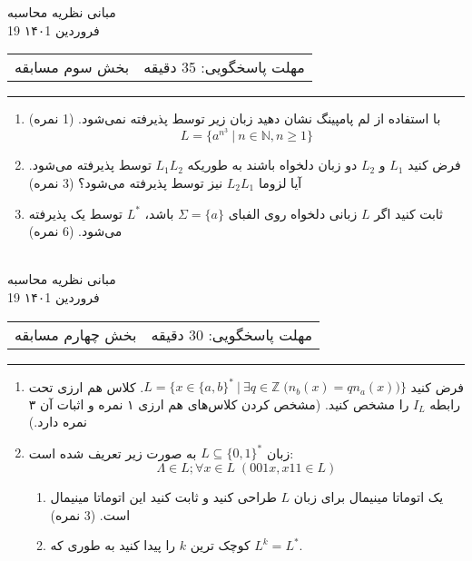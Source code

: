 \documentclass{article}
\begin{document}
   	\newpage
   	\begin{center}
   		\Huge
   		مبانی نظریه محاسبه
   		\\
   		\vspace{0.2in}
   		\Large
   		19 فروردین ۱۴۰1
   	\end{center}
   	\Large
   	\begin{tabularx}{\linewidth}{>{\raggedleft\arraybackslash}X>{\raggedright\arraybackslash}X}
   		بخش سوم مسابقه
   		&
   		مهلت پاسخگویی: 35 دقیقه
   	\end{tabularx}
   	\rule{\textwidth}{1pt}
   	\begin{enumerate}
   		
   	
  
   	\item
   با استفاده از لم پامپینگ نشان دهید زبان زیر توسط  پذیرفته نمی‌شود. (1 نمره)
   $$L = \{a^{n^3} \:|\: n \in \mathbb{N}, n \geq 1\}$$
   	 
	 \item
    فرض کنید $L_1$ و $L_2$ دو زبان دلخواه باشند به طوریکه $L_1L_2$ توسط  پذیرفته می‌شود. آیا لزوما  $L_2L_1$ نیز توسط  پذیرفته می‌شود؟ (3 نمره)
   	\item
    ثابت کنید اگر $L$ زبانی دلخواه روی الفبای $\Sigma = \{a\}$ باشد، $L^*$ توسط یک  پذیرفته می‌شود. (6 نمره)
    	 \\
    	 \\
    	\end{enumerate}
    	    	\newpage
    	 \begin{center}
    	 	\Huge
    	 	مبانی نظریه محاسبه
    	 	\\
    	 	\vspace{0.2in}
    	 	\Large
    	 	19 فروردین ۱۴۰1
    	 \end{center}
    	 \Large
    	 \begin{tabularx}{\linewidth}{>{\raggedleft\arraybackslash}X>{\raggedright\arraybackslash}X}
    	 	بخش چهارم مسابقه
    	 	&
    	 	مهلت پاسخگویی: 30 دقیقه
    	 \end{tabularx}
    	 \rule{\textwidth}{1pt}
    		\begin{enumerate}
    			\item 
    			فرض کنید 
    		$L = \{x \in \{a,b\}^* \:|\: \exists q \in \mathbb{Z} \; \big(n_b(x) = qn_a(x)\big)\}$.
    			کلاس هم ارزی تحت رابطه $I_L$ را مشخص کنید. (مشخص کردن کلاس‌های هم ارزی ۱ نمره و اثبات آن ۳ نمره دارد.)
\item 
    	 زبان $L \subseteq \{0,1\}^*$ به صورت زیر تعریف شده است:
    	 $$\Lambda \in L ; \forall x \in L \; (001x, x11 \in L) $$
    	 \begin{enumerate}
    	 	\item 
    	 	یک اتوماتا مینیمال برای زبان $ L $ طراحی کنید و ثابت کنید این اتوماتا مینیمال است. (3 نمره)
    	 	\item
    	 	کوچک ترین $ k $ را پیدا کنید به طوری که $L^k = L^*$.
    	 \end{enumerate}
	\end{enumerate}
    
\end{document}
